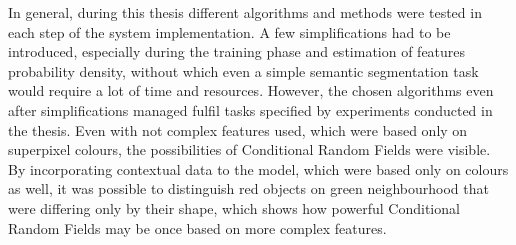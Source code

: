 In general, during this thesis different algorithms and methods were tested in each step of the system implementation. A few simplifications had to be introduced, especially during the training phase and estimation of features probability density, without which even a simple semantic segmentation task would require a lot of time and resources. However, the chosen algorithms even after simplifications managed fulfil tasks specified by experiments conducted in the thesis. Even with not complex features used, which were based only on superpixel colours, the possibilities of Conditional Random Fields were visible. By incorporating contextual data to the model, which were based only on colours as well, it was possible to distinguish red objects on green neighbourhood that were differing only by their shape, which shows how powerful Conditional Random Fields may be once based on more complex features.